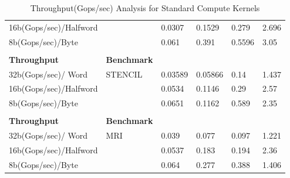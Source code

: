 \begin{table}[htbp]
\begin{adjustbox}{width=.8\textwidth}
\begin{tabular}{llllll}
		  16b(Gops/sec)/Halfword &   & 0.0307 & 0.1529 & 0.279 & 2.696 \\
		  8b(Gops/sec)/Byte &   & 0.061 & 0.391 & 0.5596 & 3.05 \\
		    &   &   &   &   &  \\
		\midrule
		  \textbf{Throughput} & \textbf{Benchmark} &   &   &   &  \\
		\midrule
		  32b(Gops/sec)/ Word   & STENCIL & 0.03589 & 0.05866 & 0.14 & 1.437 \\
		  16b(Gops/sec)/Halfword &   & 0.0534 & 0.1146 & 0.29 & 2.57 \\
		  8b(Gops/sec)/Byte &   & 0.0651 & 0.1162 & 0.589 & 2.35 \\
		    &   &   &   &   &  \\
		\midrule
		  \textbf{Throughput} & \textbf{Benchmark} &   &   &   &  \\
		\midrule
		  32b(Gops/sec)/ Word   & MRI & 0.039 & 0.077 & 0.097 & 1.221 \\
		  16b(Gops/sec)/Halfword &   & 0.0537 & 0.183 & 0.194 & 2.36 \\
		  8b(Gops/sec)/Byte &   & 0.064 & 0.277 & 0.388 & 1.406 \\
		\bottomrule
	\end{tabular}%
\end{adjustbox}%
	\caption{Throughput(Gops/sec) Analysis for Standard Compute Kernels}
		\label{poly:a}%
\end{table}%